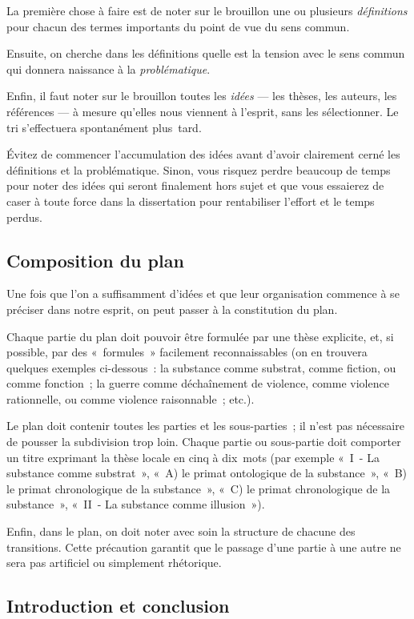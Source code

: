 \documentclass[a4paper,12pt]{article}
\begin{document}
La première chose à faire est de noter sur le brouillon une ou plusieurs
\emph{définitions} pour chacun des termes importants du point de vue du sens
commun.

Ensuite, on cherche dans les définitions quelle est la tension avec le
sens commun qui donnera naissance à la \emph{problématique}​.

Enfin, il faut noter sur le brouillon toutes les \emph{idées} --- les thèses,
les auteurs, les références --- à mesure qu'elles nous viennent à
l'esprit, sans les sélectionner. Le tri s'effectuera spontanément
plus tard.

Évitez de commencer l'accumulation des idées avant d'avoir clairement
cerné les définitions et la problématique. Sinon, vous risquez perdre
beaucoup de temps pour noter des idées qui seront finalement hors sujet
et que vous essaierez de caser à toute force dans la dissertation pour
rentabiliser l'effort et le temps perdus.

\subsection{Composition du plan}
\label{sec-1-3}

Une fois que l'on a suffisamment d'idées et que leur organisation
commence à se préciser dans notre esprit, on peut passer à la
constitution du plan.

Chaque partie du plan doit pouvoir être formulée par une thèse
explicite, et, si possible, par des « formules » facilement
reconnaissables (on en trouvera quelques exemples ci-dessous : la
substance comme substrat, comme fiction, ou comme fonction ; la guerre
comme déchaînement de violence, comme violence rationnelle, ou comme
violence raisonnable ; etc.).

Le plan doit contenir toutes les parties et les sous-parties ; il n'est
pas nécessaire de pousser la subdivision trop loin. Chaque partie ou
sous-partie doit comporter un titre exprimant la thèse locale en cinq à
dix mots (par exemple « I - La substance comme substrat », « A) le primat
ontologique de la substance », « B) le primat chronologique de la
substance », « C) le primat chronologique de la substance », « II - La
substance comme illusion »).

Enfin, dans le plan, on doit noter avec soin la structure de chacune des
transitions. Cette précaution garantit que le passage d'une partie à une
autre ne sera pas artificiel ou simplement rhétorique.

\subsection{Introduction et conclusion}
\label{sec-1-4}
\end{document}
